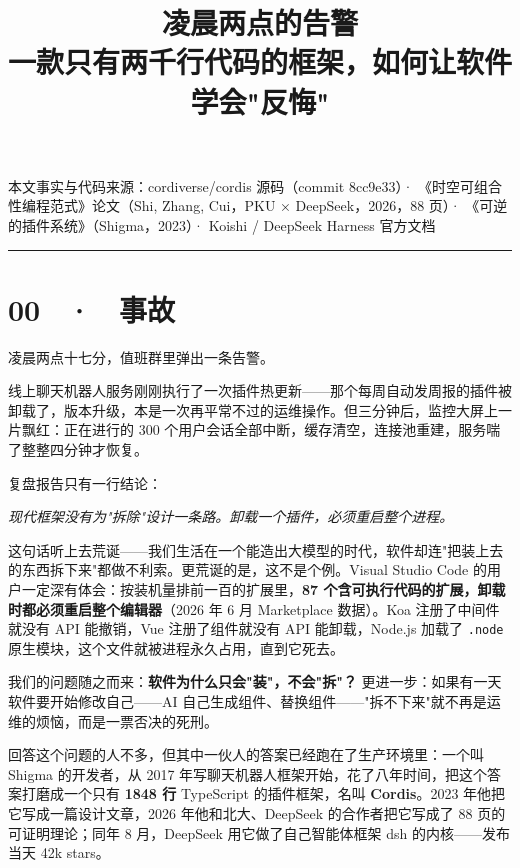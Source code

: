\documentclass[11pt,a4paper]{article}
\title{\vspace{-1.5em}\Huge 凌晨两点的告警\\[0.35em]\Large 一款只有两千行代码的框架，如何让软件学会"反悔"}
\author{}
\date{}
\begin{document}
\maketitle
\vspace{-2em}

\begin{center}
\footnotesize 本文事实与代码来源：cordiverse/cordis 源码（commit 8cc9e33）· 《时空可组合性编程范式》论文（Shi, Zhang, Cui，PKU × DeepSeek，2026，88 页）· 《可逆的插件系统》（Shigma，2023）· Koishi / DeepSeek Harness 官方文档
\end{center}

\vspace{1em}
\rule{\textwidth}{0.4pt}
\vspace{1.5em}

\section*{00 \ · \ 事故}

凌晨两点十七分，值班群里弹出一条告警。

线上聊天机器人服务刚刚执行了一次插件热更新——那个每周自动发周报的插件被卸载了，版本升级，本是一次再平常不过的运维操作。但三分钟后，监控大屏上一片飘红：正在进行的 300 个用户会话全部中断，缓存清空，连接池重建，服务喘了整整四分钟才恢复。

复盘报告只有一行结论：

\begin{center}
\itshape 现代框架没有为"拆除"设计一条路。卸载一个插件，必须重启整个进程。
\end{center}

\begin{center}

\end{center}

这句话听上去荒诞——我们生活在一个能造出大模型的时代，软件却连"把装上去的东西拆下来"都做不利索。更荒诞的是，这不是个例。Visual Studio Code 的用户一定深有体会：按装机量排前一百的扩展里，\textbf{87 个含可执行代码的扩展，卸载时都必须重启整个编辑器}（2026 年 6 月 Marketplace 数据）。Koa 注册了中间件就没有 API 能撤销，Vue 注册了组件就没有 API 能卸载，Node.js 加载了 \texttt{.node} 原生模块，这个文件就被进程永久占用，直到它死去。

我们的问题随之而来：\textbf{软件为什么只会"装"，不会"拆"？} 更进一步：如果有一天软件要开始修改自己——AI 自己生成组件、替换组件——"拆不下来"就不再是运维的烦恼，而是一票否决的死刑。

回答这个问题的人不多，但其中一伙人的答案已经跑在了生产环境里：一个叫 Shigma 的开发者，从 2017 年写聊天机器人框架开始，花了八年时间，把这个答案打磨成一个只有 \textbf{1848 行} TypeScript 的插件框架，名叫 \textbf{Cordis}。2023 年他把它写成一篇设计文章，2026 年他和北大、DeepSeek 的合作者把它写成了 88 页的可证明理论；同年 8 月，DeepSeek 用它做了自己智能体框架 dsh 的内核——发布当天 42k stars。
\end{document}
